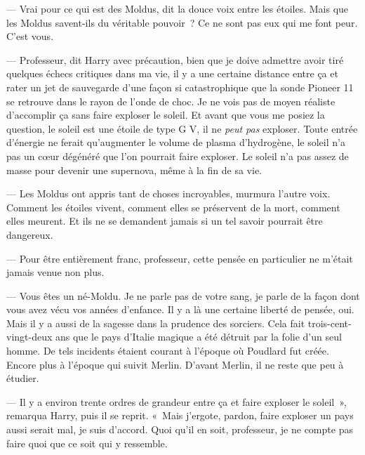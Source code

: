--- Vrai pour ce qui est des Moldus, dit la douce voix entre les étoiles.
Mais que les Moldus savent-ils du véritable pouvoir~?
Ce ne sont pas eux qui me font peur.
C'est vous.

--- Professeur, dit Harry avec précaution, bien que je doive admettre avoir tiré quelques échecs critiques dans ma vie, il y a une certaine distance entre ça et rater un jet de sauvegarde d'une façon si catastrophique que la sonde Pioneer 11 se retrouve dans le rayon de l'onde de choc.
Je ne vois pas de moyen réaliste d'accomplir ça sans faire exploser le soleil.
Et avant que vous me posiez la question, le soleil est une étoile de type G V, il ne \emph{peut pas} exploser.
Toute entrée d'énergie ne ferait qu'augmenter le volume de plasma d'hydrogène, le soleil n'a pas un cœur dégénéré que l'on pourrait faire exploser.
Le soleil n'a pas assez de masse pour devenir une supernova, même à la fin de sa vie.

--- Les Moldus ont appris tant de choses incroyables, murmura l'autre voix.
Comment les étoiles vivent, comment elles se préservent de la mort, comment elles meurent.
Et ils ne se demandent jamais si un tel savoir pourrait être dangereux.

--- Pour être entièrement franc, professeur, cette pensée en particulier ne m'était jamais venue non plus.

--- Vous êtes un né-Moldu.
Je ne parle pas de votre sang, je parle de la façon dont vous avez vécu vos années d'enfance.
Il y a là une certaine liberté de pensée, oui.
Mais il y a aussi de la sagesse dans la prudence des sorciers.
Cela fait trois-cent-vingt-deux ans que le pays d'Italie magique a été détruit par la folie d'un seul homme.
De tels incidents étaient courant à l'époque où Poudlard fut créée.
Encore plus à l'époque qui suivit Merlin.
D'avant Merlin, il ne reste que peu à étudier.

--- Il y a environ trente ordres de grandeur entre ça et faire exploser le soleil~», remarqua Harry, puis il se reprit.
«~Mais j'ergote, pardon, faire exploser un pays aussi serait mal, je suis d'accord.
Quoi qu'il en soit, professeur, je ne compte pas faire quoi que ce soit qui y ressemble.

